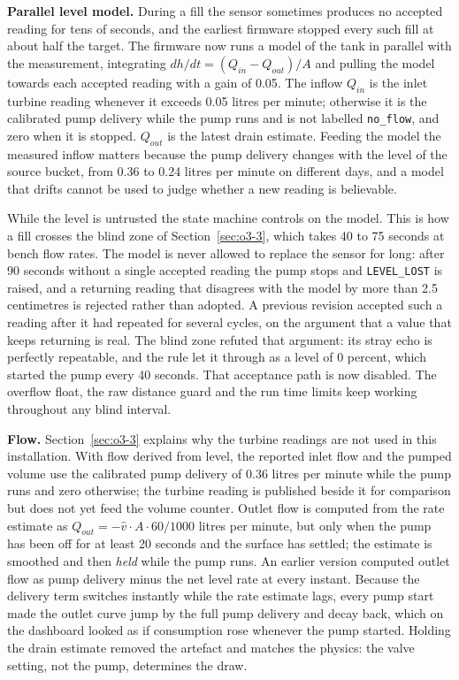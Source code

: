 \textbf{Parallel level model.} During a fill the sensor sometimes produces no accepted reading for tens of seconds, and the earliest firmware stopped every such fill at about half the target. The firmware now runs a model of the tank in parallel with the measurement, integrating $dh/dt = (Q_{in} - Q_{out})/A$ and pulling the model towards each accepted reading with a gain of 0.05. The inflow $Q_{in}$ is the inlet turbine reading whenever it exceeds 0.05 litres per minute; otherwise it is the calibrated pump delivery while the pump runs and is not labelled \texttt{no\_flow}, and zero when it is stopped. $Q_{out}$ is the latest drain estimate. Feeding the model the measured inflow matters because the pump delivery changes with the level of the source bucket, from 0.36 to 0.24 litres per minute on different days, and a model that drifts cannot be used to judge whether a new reading is believable.

While the level is untrusted the state machine controls on the model. This is how a fill crosses the blind zone of Section~\ref{sec:o3-3}, which takes 40 to 75 seconds at bench flow rates. The model is never allowed to replace the sensor for long: after 90 seconds without a single accepted reading the pump stops and \texttt{LEVEL\_LOST} is raised, and a returning reading that disagrees with the model by more than 2.5 centimetres is rejected rather than adopted. A previous revision accepted such a reading after it had repeated for several cycles, on the argument that a value that keeps returning is real. The blind zone refuted that argument: its stray echo is perfectly repeatable, and the rule let it through as a level of 0 percent, which started the pump every 40 seconds. That acceptance path is now disabled. The overflow float, the raw distance guard and the run time limits keep working throughout any blind interval.

\textbf{Flow.} Section~\ref{sec:o3-3} explains why the turbine readings are not used in this installation. With flow derived from level, the reported inlet flow and the pumped volume use the calibrated pump delivery of 0.36 litres per minute while the pump runs and zero otherwise; the turbine reading is published beside it for comparison but does not yet feed the volume counter. Outlet flow is computed from the rate estimate as $Q_{out} = -\hat{v} \cdot A \cdot 60/1000$ litres per minute, but only when the pump has been off for at least 20 seconds and the surface has settled; the estimate is smoothed and then \emph{held} while the pump runs. An earlier version computed outlet flow as pump delivery minus the net level rate at every instant. Because the delivery term switches instantly while the rate estimate lags, every pump start made the outlet curve jump by the full pump delivery and decay back, which on the dashboard looked as if consumption rose whenever the pump started. Holding the drain estimate removed the artefact and matches the physics: the valve setting, not the pump, determines the draw.

